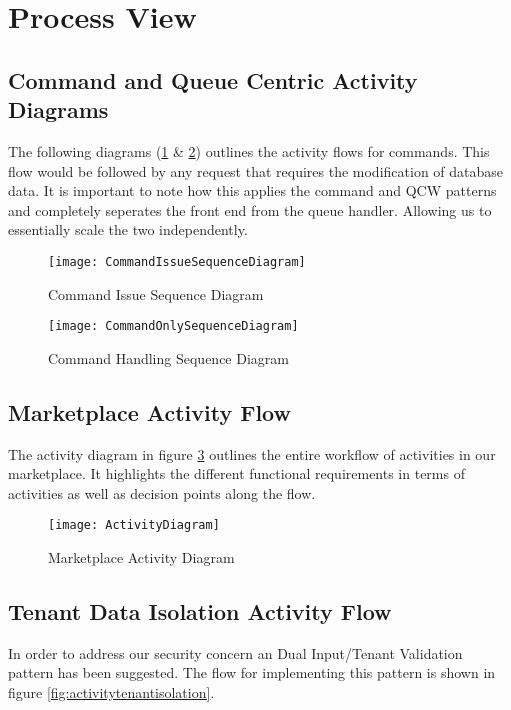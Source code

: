 \section{Process View}
\subsection{Command and Queue Centric Activity Diagrams}
The following diagrams (\ref{fig:commandissuesequencediagram} \& \ref{fig:commandhandlesequencediagram}) outlines the activity flows for commands. This flow would be followed by any request that requires the modification of database data. It is important to note how this applies the command and QCW  patterns and completely seperates the front end from the queue handler. Allowing us to essentially scale the two independently. 

\begin{figure}
\centering
\texttt{[image: CommandIssueSequenceDiagram]}
\caption{Command Issue Sequence Diagram}
\label{fig:commandissuesequencediagram}
\end{figure}

\begin{figure}
\centering
\texttt{[image: CommandOnlySequenceDiagram]}
\caption{Command Handling Sequence Diagram}
\label{fig:commandhandlesequencediagram}
\end{figure}


\subsection{Marketplace Activity Flow}
The activity diagram in figure \ref{fig:activitydiagram} outlines the entire workflow of activities in our marketplace. It highlights the different functional requirements in terms of activities as well as decision points along the flow.  
\begin{figure}
\centering
\texttt{[image: ActivityDiagram]}
\caption{Marketplace Activity Diagram}
\label{fig:activitydiagram}
\end{figure}


\subsection{Tenant Data Isolation Activity Flow}
In order to address our security concern an Dual Input/Tenant Validation pattern has been suggested. The flow for implementing this pattern is shown in figure \ref{fig:activitytenantisolation}.

